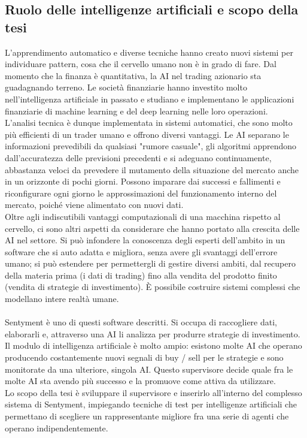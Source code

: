 \documentclass{article}
\numberwithin{equation}{section}
\begin{document}
	\subsection{Ruolo delle intelligenze artificiali e scopo della tesi}		
	L'apprendimento automatico e diverse tecniche hanno creato nuovi sistemi per individuare pattern, cosa che il cervello umano non è in grado di fare. Dal momento che la finanza è quantitativa, la AI nel trading azionario sta guadagnando terreno. Le società finanziarie hanno investito molto nell'intelligenza artificiale in passato e studiano e implementano le applicazioni finanziarie di machine learning e del deep learning nelle loro operazioni.\\
	L'analisi tecnica è dunque implementata in sistemi automatici, che sono molto più efficienti di un trader umano e offrono diversi vantaggi. Le AI separano le informazioni prevedibili da qualsiasi "rumore casuale", gli algoritmi apprendono dall'accuratezza delle previsioni precedenti e si adeguano continuamente, abbastanza veloci da prevedere il mutamento della situazione del mercato anche in un orizzonte di pochi giorni. Possono imparare dai successi e fallimenti e riconfigurare ogni giorno le approssimazioni del funzionamento interno del mercato, poiché viene alimentato con nuovi dati.\\
	Oltre agli indiscutibili vantaggi computazionali di una macchina rispetto al cervello, ci sono altri aspetti da considerare che hanno portato alla crescita delle AI nel settore. Si può infondere la conoscenza degli esperti dell'ambito in un software che si auto adatta e migliora, senza avere gli svantaggi dell'errore umano; si può estendere per permettergli di gestire diversi ambiti, dal recupero della materia prima (i dati di trading) fino alla vendita del prodotto finito (vendita di strategie di investimento). È possibile costruire sistemi complessi che modellano intere realtà umane.\\~\\
	Sentyment è uno di questi software descritti. Si occupa di raccogliere dati, elaborarli e, attraverso una AI li analizza per produrre strategie di investimento. Il modulo di intelligenza artificiale è molto ampio: esistono molte AI che operano producendo costantemente nuovi segnali di buy / sell per le strategie e sono monitorate da una ulteriore, singola AI. Questo supervisore decide quale fra le molte AI sta avendo più successo e la promuove come attiva da utilizzare.\\
	Lo scopo della tesi è sviluppare il supervisore e inserirlo all'interno del complesso sistema di Sentyment, impiegando tecniche di test per intelligenze artificiali che permettano di scegliere un rappresentante migliore fra una serie di agenti che operano indipendentemente.
	
\end{document}
